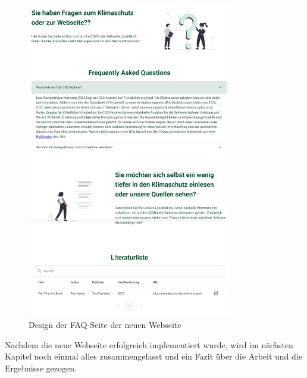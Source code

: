 \begin{figure}[H]
    \centering
    \includegraphics[width=0.8\textwidth]{images/06/FAQ-Design.jpeg}
    \caption{Design der FAQ-Seite der neuen Webseite}
    \label{fig:new-co2runter-faq-design}
\end{figure}


Nachdem die neue Webseite erfolgreich implementiert wurde, wird im nächsten Kapitel noch einmal alles zusammengefasst und ein Fazit über die Arbeit und die Ergebnisse gezogen.
